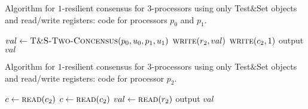\documentclass[11pt]{article}
\newcommand\twoconsensusF{\textsc{T\&S-Two-Concensus}}
\newcommand\writeF{\textsc{write}}
\newcommand\readF{\textsc{read}}
\begin{document}
\begin{algorithm}
	\caption{Algorithm for $1$-resilient consensus for $3$-processors using only Test$\&$Set objects and read/write registers: code for processors $p_0$ and $p_1$.}
    \label{pseudocode:TCTestNSetCase1}
    \begin{algorithmic}[1]
	\State $val \leftarrow \twoconsensusF(p_0, u_0, p_1, u_1)$
	\State $\writeF(r_2, val)$
	\State $\writeF(c_2, 1)$
	\State output $val$
    \end{algorithmic}
\end{algorithm}

\begin{algorithm}
	\caption{Algorithm for $1$-resilient consensus for $3$-processors using only Test$\&$Set objects and read/write registers: code for processor $p_2$.}
    \label{pseudocode:TCTestNSetCase2}
    \begin{algorithmic}[1]
	\State $c \leftarrow \readF(c_2)$
		\State $c \leftarrow \readF(c_2)$
	\EndWhile
	\State $val \leftarrow \readF(r_2)$
	\State output $val$
    \end{algorithmic}
\end{algorithm}

\end{document}
